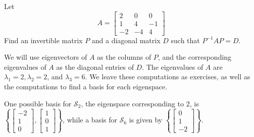 \documentclass{ximera}
\begin{document}
\begin{example}\label{ex:diagonalizematrix}
Let
\begin{equation*}
A=\begin{bmatrix}
2 & 0 & 0 \\
1 & 4 & -1 \\
-2 & -4 & 4
\end{bmatrix}
\end{equation*}
 Find an invertible matrix $P$ and a diagonal matrix $D$ such that $P^{-1}AP=D$.

\begin{explanation}
We will use eigenvectors of $A$ as the columns of $P$, and
the corresponding eigenvalues of $A$ as the diagonal entries of $D$. The eigenvalues of $A$ are $\lambda_1 =2,\lambda_2 = 2$, and $\lambda_3 = 6$.   We leave these computations as exercises, as well as the computations to find a basis for each eigenspace.  

One possible basis for $\mathcal{S}_2$, the eigenspace corresponding to $2$, is 
$\left\{
\begin{bmatrix}
-2 \\
1 \\
0
\end{bmatrix},
\begin{bmatrix}
1 \\
0 \\
1
\end{bmatrix}
\right\}$, 
while a basis for $\mathcal{S}_6$ is given by 
$\left\{\begin{bmatrix}
0 \\
1 \\
-2
\end{bmatrix}\right\}$.


\end{explanation}
\end{example}
\end{document}

